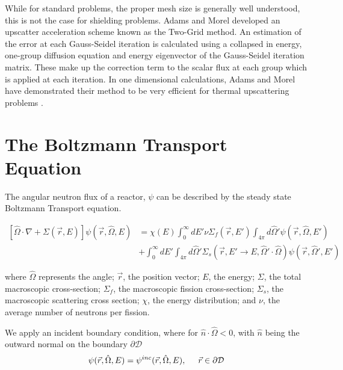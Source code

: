 \par
While for standard problems, the proper mesh size is generally well understood, this is not the case for shielding problems. Adams and Morel developed an upscatter acceleration scheme known as the Two-Grid method. An estimation of the error at each Gauss-Seidel iteration is calculated using a collapsed in energy, one-group diffusion equation and energy eigenvector of the Gauss-Seidel iteration matrix. These make up the correction term to the scalar flux at each group which is applied at each iteration. In one dimensional calculations, Adams and Morel have demonstrated their method to be very efficient for thermal upscattering problems \cite{morel-upscat}.

\section{The Boltzmann Transport Equation}
The angular neutron flux of a reactor, $\psi$ can be described by the steady state Boltzmann Transport equation.

\begin{equation}
\begin{split}
 [\hat{\Omega} \cdot \nabla + \Sigma(\vec{r}, E)]\psi(\vec{r}, \hat{\Omega}, E) &= \chi(E) \int_0^\infty dE' \nu \Sigma_{f}(\vec{r}, E') \int_{4\pi} d\hat{\Omega}'\psi(\vec{r}, \hat{\Omega}, E') \\   &+ \int_0^\infty dE' \int_{4\pi} d\hat{\Omega}' \Sigma_s(\vec{r}, E' \rightarrow E, \hat{\Omega}' \cdot \hat{\Omega})\psi(\vec{r}, \hat{\Omega}', E')   
\end{split}
\label{eq:transport}
\end{equation}


where $\hat{\Omega}$ represents the angle; $\vec{r}$, the position vector; $E$, the energy; $\Sigma$, the total macroscopic cross-section; $\Sigma_f$, the macroscopic fission cross-section; $\Sigma_s$, the macroscopic scattering cross section; $\chi$, the energy distribution; and $\nu$, the average number of neutrons per fission. 

We apply an incident boundary condition, where for $\hat{n} \cdot \hat{\Omega} < 0$, with $\hat{n}$ being the outward normal on the boundary $\partial \mathcal{D}$
\begin{equation}
    \psi(\vec{r}, \hat{\Omega}, E) = \psi^{inc}(\vec{r}, \hat{\Omega}, E), \hspace{5mm} \vec{r} \in \partial \mathcal{D}
\end{equation}

